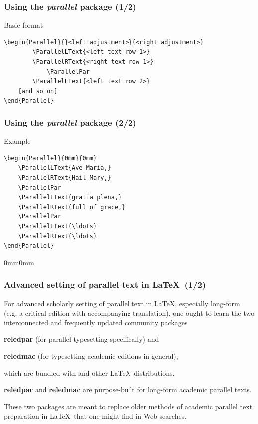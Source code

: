 \documentclass[aspectratio=169]{beamer}
\begin{document}
\begin{frame}[fragile]
	\frametitle[Using parallel]{Using the \textit{parallel} package {\scriptsize (1/2)}}

Basic format \break

{\footnotesize \begin{lstlisting}
\begin{Parallel}{}<left adjustment>}{<right adjustment>}
		\ParallelLText{<left text row 1>}
		\ParallelRText{<right text row 1>}
			\ParallelPar
		\ParallelLText{<left text row 2>}
	[and so on]	
\end{Parallel}	
\end{lstlisting}}
\end{frame}

\begin{frame}[fragile]
	\frametitle[Using parallel]{Using the \textit{parallel} package {\scriptsize (2/2)}}

Example \break

{\footnotesize \begin{lstlisting}
\begin{Parallel}{0mm}{0mm}
	\ParallelLText{Ave Maria,}
	\ParallelRText{Hail Mary,}
	\ParallelPar
	\ParallelLText{gratia plena,}
	\ParallelRText{full of grace,}
	\ParallelPar
	\ParallelLText{\ldots}
	\ParallelRText{\ldots}
\end{Parallel}	
\end{lstlisting}}
\vfill
\begin{Parallel}{0mm}{0mm}
	\ParallelPar
	\ParallelPar
	\ParallelLText{\ldots}
	\ParallelRText{\ldots}
\end{Parallel}	

\end{frame}

\begin{frame}[fragile]
	\frametitle[Advanced Parallel Text]{Advanced setting of parallel text in \LaTeX\  {\scriptsize (1/2)}}
	
For advanced scholarly setting of parallel text in \LaTeX, especially long-form (e.g. a critical edition with accompanying translation), one ought to learn the two interconnected and frequently updated community packages \break 

\textbf{reledpar} (for parallel typesetting specifically) and \break 

\textbf{reledmac} (for typesetting academic editions in general),\break 

which are bundled with  and other \LaTeX\ distributions. \break

\textbf{reledpar} and \textbf{reledmac} are purpose-built for long-form academic parallel texts. \break

These two packages are meant to replace older methods of academic parallel text preparation in \LaTeX\ that one might find in Web searches. \break
\end{frame}
\end{document}

